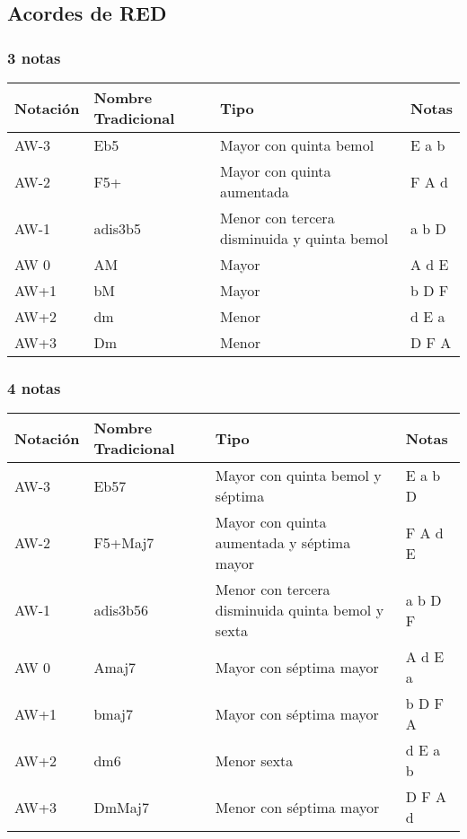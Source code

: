 \documentclass[]{article}
\begin{document}
\subsection*{Acordes de RED}

\subsubsection*{3 notas}

\begin{table}[H]
  \centering
  \begin{tabularx}{\textwidth}{ll>{\raggedright\arraybackslash}Xl}
\toprule
Notación & Nombre Tradicional & Tipo & Notas \\
\midrule
\textsf{AW-3} & Eb5     & Mayor con quinta bemol & E a b \\
\textsf{AW-2} & F5+     & Mayor con quinta aumentada & F A d \\
\textsf{AW-1} & adis3b5 & Menor con tercera disminuida y quinta bemol & a b D \\
\textsf{AW 0} & AM      & Mayor & A d E \\
\textsf{AW+1} & bM      & Mayor & b D F \\
\textsf{AW+2} & dm      & Menor & d E a \\
\textsf{AW+3} & Dm      & Menor & D F A \\ 
\bottomrule
\end{tabularx}
\end{table}

\subsubsection*{4 notas}
\begin{table}[H]
  \centering
  \begin{tabularx}{\textwidth}{ll>{\raggedright\arraybackslash}Xl}
\toprule
Notación & Nombre Tradicional & Tipo & Notas \\
\midrule
\textsf{AW-3} & Eb57     & Mayor con quinta bemol y séptima & E a b D\\
\textsf{AW-2} & F5+Maj7  & Mayor con quinta aumentada y séptima mayor & F A d E\\
\textsf{AW-1} & adis3b56 & Menor con tercera disminuida quinta bemol y sexta & a b D F\\
\textsf{AW 0} & Amaj7    & Mayor con séptima mayor & A d E a \\
\textsf{AW+1} & bmaj7    & Mayor con séptima mayor & b D F A \\
\textsf{AW+2} & dm6      & Menor sexta & d E a b \\
\textsf{AW+3} & DmMaj7   & Menor con séptima mayor & D F A d \\ 
\bottomrule
\end{tabularx}
\end{table}
\end{document}
